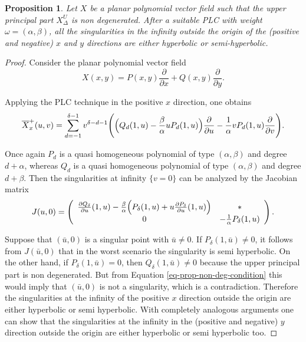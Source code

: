 \documentclass[12pt]{amsart}
\newtheorem{proposition}[theorem]{Proposition}
\begin{document}
\begin{proposition}
Let $X$ be a planar polynomial vector field such that the upper principal part $X^{U}_{\Delta}$ is non degenerated. After a suitable PLC with weight $\omega = (\alpha, \beta)$, all the singularities in the infinity outside the origin of the (positive and negative) $x$ and $y$ directions are either hyperbolic or semi-hyperbolic.   
\end{proposition}
\begin{proof}
Consider the planar polynomial vector field
$$X(x,y) = P(x,y)\displaystyle\frac{\partial}{\partial x} + Q(x,y)\displaystyle\frac{\partial}{\partial y}.$$

Applying the PLC technique in the positive $x$ direction, one obtains
\begin{equation}\label{eq-prop-non-deg-condition}
\overline{X}^{+}_{x}(u,v) = \displaystyle\sum_{d = -1}^{\delta - 1}v^{\delta - d - 1}\Bigg{(}\Big{(}Q_{d}(1,u) - \frac{\beta}{\alpha}uP_{d}(1,u)\Big{)}\displaystyle\frac{\partial}{\partial u} -\displaystyle\frac{1}{\alpha}vP_{d}(1,u)\displaystyle\frac{\partial}{\partial v} \Bigg{)}.    
\end{equation}

Once again $P_{d}$ is a quasi homogeneous polynomial of type $(\alpha,\beta)$ and degree $d + \alpha$, whereas $Q_{d}$ is a quasi homogeneous polynomial of type $(\alpha,\beta)$ and degree $d + \beta$. Then the singularities at infinity $\{v = 0\}$ can be analyzed by the Jacobian matrix
$$
J(u,0) = \left(
  \begin{array}{cc}
    \frac{\partial Q_{\delta}}{\partial u}(1,u) - \frac{\beta}{\alpha}\Big{(}P_{\delta}(1,u) + u\frac{\partial P_{\delta}}{\partial u}(1,u)\Big{)} & * \\
    0 & -\frac{1}{\alpha}P_{\delta}(1,u) \\
  \end{array}
\right). 
$$

Suppose that $(\bar{u},0)$ is a singular point with $\bar{u}\neq 0$. If $P_{\delta}(1,\bar{u}) \neq 0$, it follows from $J(\bar{u},0)$ that in the worst scenario the singularity is semi hyperbolic. On the other hand, if $P_{\delta}(1,\bar{u}) = 0$, then $Q_{\delta}(1,\bar{u}) \neq 0$ because the upper principal part is non degenerated. But from Equation \eqref{eq-prop-non-deg-condition} this would imply that $(\bar{u},0)$ is not a singularity, which is a contradiction. Therefore the singularities at the infinity of the positive $x$ direction outside the origin are either hyperbolic or semi hyperbolic. With completely analogous arguments one can show that the singularities at the infinity in the (positive and negative) $y$ direction outside the origin are either hyperbolic or semi hyperbolic too.
\end{proof}
\end{document}
